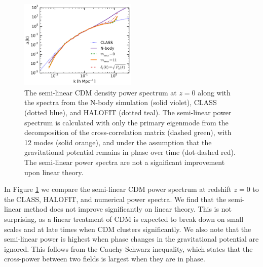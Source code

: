 \documentclass{aastex}
\newcommand{\halofit}{HALOFIT }
\newcommand{\halofitns}{HALOFIT}
\begin{document}
\begin{figure}[h!]
  \centering
    \includegraphics[width=0.495\textwidth]{Figures/density_cdm_0.pdf}
    \caption{The semi-linear CDM density power spectrum at $z=0$ along with the
      spectra from the N-body simulation (solid
      violet),
      CLASS (dotted blue), and \halofit (dotted teal).  
The semi-linear power spectrum is calculated with only the primary
eigenmode from the decomposition of the cross-correlation matrix
(dashed green), with 12 modes (solid orange), and under the assumption
that the gravitational potential remains in phase over time
(dot-dashed red).
      The semi-linear power spectra are not a significant improvement
      upon linear theory.  
}
    \label{fig:delta_cdm_rec}
\end{figure}

In Figure \ref{fig:delta_cdm_rec} we compare the semi-linear CDM
 power spectrum at redshift $z=0$ to the CLASS, \halofitns, and
numerical power spectra. We find that the semi-linear method does not improve
significantly on linear theory.  This is not surprising, as a linear
treatment of CDM is expected to break down on small scales and
at late times when CDM clusters significantly.  
We also note that the semi-linear power is highest when phase changes 
in the gravitational potential are ignored.  
This follows from the Cauchy-Schwarz inequality, which
states that the cross-power between two fields is largest when they
are in phase.
\end{document}
